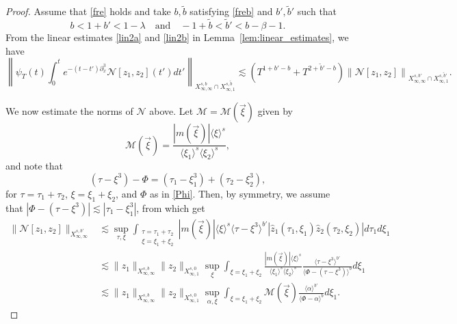 \documentclass[a4paper,
11pt,  reqno]{amsart}
\newcommand{\jap}[1]{\langle #1 \rangle}
\newcommand{\5}{\textup{V}}
\newcommand{\ft}{\widehat}
\newcommand{\les}{\lesssim}
\newcommand{\wt}{\widetilde}
\theoremstyle{remark}
\newcommand{\jb}[1]
{\langle #1 \rangle}
\newcommand{\M}{\mathcal{M}}
\numberwithin{equation}{section}
\numberwithin{theorem}{section}
\newcommand{\Ncal}{\mathcal{N}}
\begin{document}
		\begin{proof}
Assume that \eqref{fre} holds and take $b,\wt b$ satisfying \eqref{freb} and $b', \wt b'$ such that
			$$
			 b < 1+b'< 1-\lambda
             \quad
             \text{and}
             \quad
             -1+\wt{b}<\wt{b}'<b-\beta-1.
$$
From the linear estimates \eqref{lin2a} and \eqref{lin2b} in Lemma~\ref{lem:linear_estimates}, we have
        $$
        \left\|\psi_T(t)\int_0^t e^{-(t-t')\partial_x^3}\Ncal[z_1,z_2](t')dt' \right\|_{X^{s,b}_{\infty, \infty} \cap X^{s,\wt{b}}_{\infty,1}}  \lesssim (T^{1+b'-b} + T^{2+\wt{b}'-b})\left\|\Ncal[z_1,z_2] \right\|_{X^{s,b'}_{\infty, \infty} \cap X^{s,\wt{b}'}_{\infty,1}}.
        $$

We now estimate the norms of $\Ncal$ above. Let $\M = \M(\vec\xi)$ given by
\begin{equation}
\mathcal{M}(\vec\xi)=\frac{|m(\vec\xi)|\jap{\xi}^s}{\jap{\xi_1}^s\jap{\xi_2}^s},
\end{equation}
and note that
\begin{equation}
(\tau - \xi^3) - \Phi = (\tau_1 - \xi_1^3 ) + (\tau_2 - \xi_2^3),
\end{equation}
for $\tau=\tau_1+ \tau_2$, $\xi=\xi_1+\xi_2$, and $\Phi$ as in \eqref{Phi}. Then, by symmetry, we assume that $|\Phi - (\tau-\xi^3) | \les |\tau_1 - \xi_1^3|$, from which get
	\begin{align}
				\|\Ncal[z_1,z_2] \|_{X^{s,b'}_{\infty, \infty}} &\lesssim \sup_{\tau,\xi} \int_{\substack{\tau=\tau_1+\tau_2 \\ \xi = \xi_1 + \xi_2}}
|m(\vec\xi) | \jb{\xi}^s
\jap{\tau-\xi^3}^{b'}
|\ft{z}_1(\tau_1, \xi_1)
\ft{z}_2(\tau_2, \xi_2)
|
d\tau_1 d\xi_1
\\
&
\lesssim
 \|z_1\|_{X^{s,b}_{\infty,\infty}}
 \|z_2\|_{X^{s,0}_{\infty, 1}}
\sup_{\xi}
\int_{\xi = \xi_1 + \xi_2}
\frac{|m(\vec\xi)| \jb{\xi}^s}{\jb{\xi_1}^s \jb{\xi_2}^s}
\frac{\jb{\tau-\xi^3}^{b'}}{\jb{\Phi - (\tau-\xi^3)}^{b}}
d\xi_1
\\
&
\lesssim
 \|z_1\|_{X^{s,b}_{\infty,\infty}}
 \|z_2\|_{X^{s,0}_{\infty, 1}}
\sup_{\alpha,\xi}
\int_{\xi = \xi_1 + \xi_2}  \mathcal{M}(\vec\xi)\frac{\jap{\alpha}^{b'}}{\jap{\Phi-\alpha}^b  } d\xi_1 .
\label{FREinfty1}
			\end{align}



\end{proof}
\end{document}
